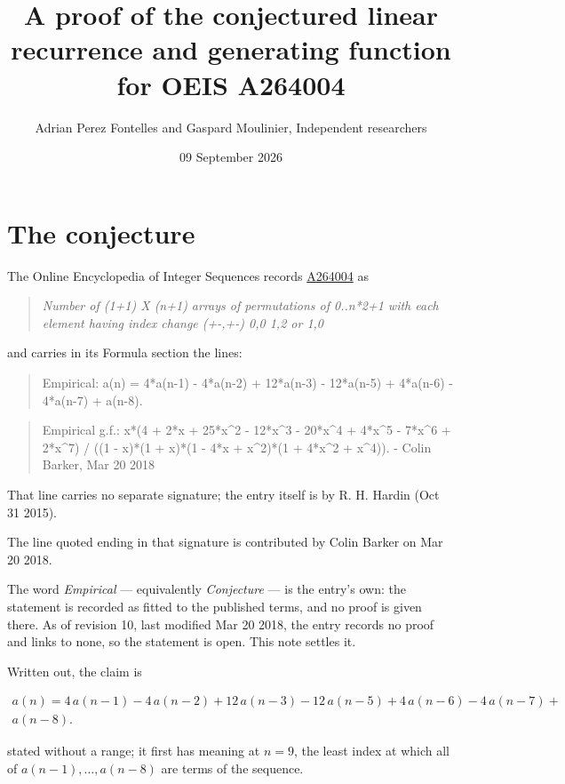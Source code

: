 \documentclass[11pt]{article}
\title{A proof of the conjectured linear recurrence and generating function for OEIS A264004}
\author{Adrian Perez Fontelles and Gaspard Moulinier, Independent researchers}
\date{09 September 2026}
\theoremstyle{definition}
\begin{document}
\maketitle
\section{The conjecture}

The Online Encyclopedia of Integer Sequences records \href{https://oeis.org/A264004}{A264004} as

\begin{quote}\itshape Number of (1+1) X (n+1) arrays of permutations of 0..n*2+1 with each element having index change (+-,+-) 0,0 1,2 or 1,0\end{quote}

and carries in its Formula section the lines:

\begin{quote}\ttfamily Empirical: a(n) = 4*a(n-1) - 4*a(n-2) + 12*a(n-3) - 12*a(n-5) + 4*a(n-6) - 4*a(n-7) + a(n-8).\end{quote}

\begin{quote}\ttfamily Empirical g.f.: x*(4 + 2*x + 25*x\textasciicircum{}2 - 12*x\textasciicircum{}3 - 20*x\textasciicircum{}4 + 4*x\textasciicircum{}5 - 7*x\textasciicircum{}6 + 2*x\textasciicircum{}7) / ((1 - x)*(1 + x)*(1 - 4*x + x\textasciicircum{}2)*(1 + 4*x\textasciicircum{}2 + x\textasciicircum{}4)). - Colin Barker, Mar 20 2018\end{quote}

That line carries no separate signature; the entry itself is by R. H. Hardin (Oct 31 2015).

The line quoted ending in that signature is contributed by Colin Barker on Mar 20 2018.

The word {\itshape Empirical} --- equivalently {\itshape Conjecture} --- is the entry's own: the statement is recorded as fitted to the published terms, and no proof is given there. As of revision 10, last modified Mar 20 2018, the entry records no proof and links to none, so the statement is open. This note settles it.

Written out, the claim is

\begin{multline*} a(n) = 4\,a(n-1) - 4\,a(n-2) + 12\,a(n-3) - 12\,a(n-5) + 4\,a(n-6) - 4\,a(n-7) + \\ a(n-8). \end{multline*}

stated without a range; it first has meaning at $n = 9$, the least index at which all of $a(n-1),\dots,a(n-8)$ are terms of the sequence.
\end{document}
